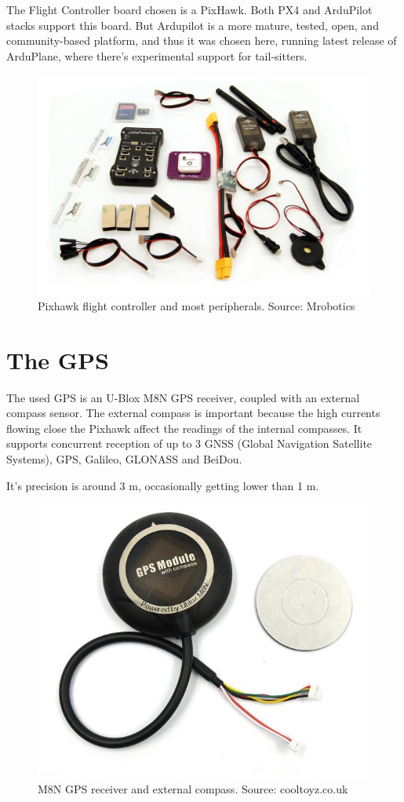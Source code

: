 The Flight Controller board chosen is a PixHawk. Both PX4 and ArduPilot stacks support this board. But Ardupilot is a more mature, tested, open, and community-based platform, and thus it was chosen here, running latest release of ArduPlane, where there's experimental support for tail-sitters.

\begin{figure}[H]
\centering
  \includegraphics[width=0.8\linewidth]{figs/pixhawk.jpg}
  \caption{Pixhawk flight controller and most peripherals. Source: Mrobotics}
  \label{fig:pixhawk}
\end{figure}

\section{The GPS}
The used GPS is an U-Blox M8N GPS receiver, coupled with an external compass sensor. The external compass is important because the high currents flowing close the Pixhawk affect the readings of the internal compasses.
%
It supports concurrent reception of up to 3 GNSS (Global Navigation Satellite Systems), GPS, Galileo, GLONASS and BeiDou.

It's precision is around 3 m, occasionally getting lower than 1 m\cite{m8ntest}.

\begin{figure}[H]
\centering
  \includegraphics[width=0.8\linewidth]{figs/m8n.jpg}
  \caption{M8N GPS receiver and external compass. Source: cooltoyz.co.uk}
  \label{fig:m8n}
\end{figure}


